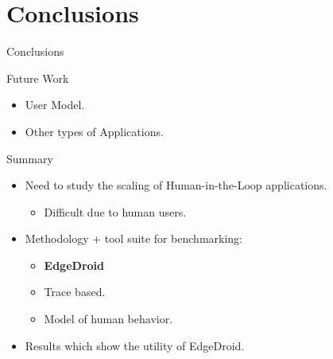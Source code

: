 \documentclass[aspectratio=1610]{beamer}
\begin{document}
\section{Conclusions}
\begin{frame}{Conclusions}
    \begin{block}{Future Work}
        \begin{itemize}
            \item User Model.
            \item Other types of Applications.
        \end{itemize}
    \end{block}

    \begin{block}{Summary}
        \begin{itemize}
            \item Need to study the scaling of Human-in-the-Loop applications.
                  \begin{itemize}
                      \item Difficult due to human users.
                  \end{itemize}
            \item Methodology + tool suite for benchmarking:
                  \begin{itemize}
                      \item \textbf{EdgeDroid}
                      \item Trace based.
                      \item Model of human behavior.
                  \end{itemize}
            \item Results which show the utility of EdgeDroid.
        \end{itemize}
    \end{block}
\end{frame}
\end{document}
